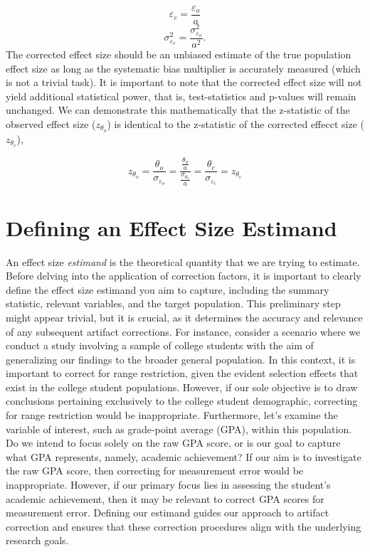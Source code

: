 \documentclass[
  letterpaper,
  DIV=11,
  numbers=noendperiod]{scrreprt}
\begin{document}
\[
\varepsilon_c = \frac{\varepsilon_o}{a}
\] \[
\sigma_{\varepsilon_c}^2 = \frac{\sigma^2_{\varepsilon_o}}{a^2}.
\] The corrected effect size should be an unbiased estimate of the true
population effect size as long as the systematic bias multiplier is
accurately measured (which is not a trivial task). It is important to
note that the corrected effect size will not yield additional
statistical power, that is, test-statistics and p-values will remain
unchanged. We can demonstrate this mathematically that the z-statistic
of the observed effect size (\(z_{\theta_o}\)) is identical to the
z-statistic of the corrected effecct size (\(z_{\theta_c}\)),

\[
z_{\theta_o} = \frac{\theta_o}{\sigma_{\varepsilon_o}} = \frac{\frac{\theta_o}{a}}{\frac{\sigma_{\theta_o}}{a}} = \frac{\theta_c}{\sigma_{\varepsilon_c}} = z_{\theta_c}
\]

\hypertarget{defining-an-effect-size-estimand}{%
\section{Defining an Effect Size
Estimand}\label{defining-an-effect-size-estimand}}

An effect size \emph{estimand} is the theoretical quantity that we are
trying to estimate. Before delving into the application of correction
factors, it is important to clearly define the effect size estimand you
aim to capture, including the summary statistic, relevant variables, and
the target population. This preliminary step might appear trivial, but
it is crucial, as it determines the accuracy and relevance of any
subsequent artifact corrections. For instance, consider a scenario where
we conduct a study involving a sample of college students with the aim
of generalizing our findings to the broader general population. In this
context, it is important to correct for range restriction, given the
evident selection effects that exist in the college student populations.
However, if our sole objective is to draw conclusions pertaining
exclusively to the college student demographic, correcting for range
restriction would be inappropriate. Furthermore, let's examine the
variable of interest, such as grade-point average (GPA), within this
population. Do we intend to focus solely on the raw GPA score, or is our
goal to capture what GPA represents, namely, academic achievement? If
our aim is to investigate the raw GPA score, then correcting for
measurement error would be inappropriate. However, if our primary focus
lies in assessing the student's academic achievement, then it may be
relevant to correct GPA scores for measurement error. Defining our
estimand guides our approach to artifact correction and ensures that
these correction procedures align with the underlying research goals.
\end{document}
